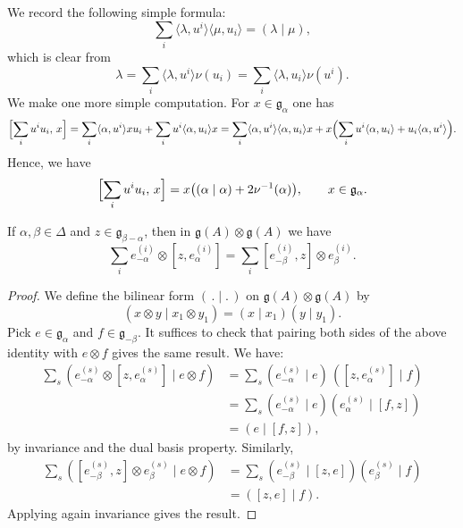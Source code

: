 \documentclass[12pt]{article}
\begin{document}
We record the following simple formula:
\begin{equation}\label{eq:bilinear-dual}
    \sum_i \langle \lambda,u^i \rangle \langle \mu,u_i \rangle = (\lambda\mid \mu),
\end{equation}
which is clear from
\[
    \lambda = \sum_i \langle \lambda,u^i\rangle \nu(u_i)
    = \sum_i \langle \lambda,u_i\rangle \nu(u^i).
\]
We make one more simple computation.
For $x\in \mathfrak{g}_\alpha$ one has
\[
    \Bigl[\sum_i u^i u_i,\, x\Bigr]
    = \sum_i \langle \alpha,u^i\rangle x u_i + \sum_i u^i \langle \alpha,u_i\rangle x
    = \sum_i \langle \alpha,u^i\rangle \langle \alpha,u_i\rangle x
    + x\Bigl(\sum_i u^i \langle \alpha,u_i\rangle + u_i \langle \alpha,u^i\rangle\Bigr).
\]
Hence, we have
\begin{align}\label{eq:commutator-Cartan}
    \Bigl[\sum_i u^i u_i,\, x\Bigr] = x\bigl((\alpha\mid \alpha) + 2\nu^{-1}(\alpha)\bigr),
    \qquad x\in \mathfrak{g}_\alpha.
\end{align}



\begin{lemma}\label{lem:important-calculation}
    If $\alpha,\beta \in \Delta$ and $z \in \mathfrak{g}_{\beta-\alpha}$, then in $\mathfrak{g}(A)\otimes \mathfrak{g}(A)$ we have
    \[
        \sum_i e_{-\alpha}^{(i)} \otimes [z,e_\alpha^{(i)}]
        = \sum_i [e_{-\beta}^{(i)},z] \otimes e_\beta^{(i)}.
    \]
\end{lemma}

\begin{proof}
    We define the bilinear form $(\,.\mid .\,)$ on $\mathfrak{g}(A)\otimes \mathfrak{g}(A)$ by
    \[
        (x\otimes y \mid x_1\otimes y_1) = (x\mid x_1)(y\mid y_1).
    \]
    Pick $e \in \mathfrak{g}_\alpha$ and $f \in \mathfrak{g}_{-\beta}$.
    It suffices to check that pairing both sides of the above identity with $e \otimes f$ gives the same result. We have:
    \begin{align*}
        \sum_s (e_{-\alpha}^{(s)} \otimes [z,e_\alpha^{(s)}] \mid e\otimes f)
         & = \sum_s (e_{-\alpha}^{(s)} \mid e)\,([z,e_\alpha^{(s)}]\mid f) \\
         & = \sum_s (e_{-\alpha}^{(s)} \mid e)(e_\alpha^{(s)} \mid [f,z])  \\
         & = (e\mid [f,z]),
    \end{align*}
    by invariance and the dual basis property. Similarly,
    \begin{align*}
        \sum_s ([e_{-\beta}^{(s)},z]\otimes e_\beta^{(s)} \mid e\otimes f)
         & = \sum_s (e_{-\beta}^{(s)} \mid [z,e])(e_\beta^{(s)}\mid f) \\
         & = ([z,e]\mid f).
    \end{align*}
    Applying again invariance gives the result.
\end{proof}
\end{document}
